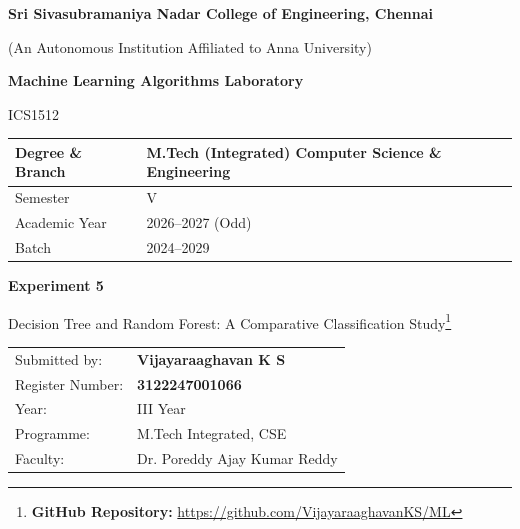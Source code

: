\documentclass[11pt,a4paper]{article}
\title{}
\date{}
\begin{document}
\begin{titlepage}
\centering
\vspace*{1cm}
{\Large\bfseries Sri Sivasubramaniya Nadar College of Engineering, Chennai\par}
\vspace{0.2cm}
{\normalsize (An Autonomous Institution Affiliated to Anna University)\par}
\vspace{1.2cm}

{\Large\bfseries Machine Learning Algorithms Laboratory\par}
\vspace{0.3cm}
{\large ICS1512\par}
\vspace{1.5cm}

\begin{tabular}{|p{5.5cm}|p{7cm}|}
\hline
Degree \& Branch & M.Tech (Integrated) Computer Science \& Engineering \\
\hline
Semester & V \\
\hline
Academic Year & 2026--2027 (Odd) \\
\hline
Batch & 2024--2029 \\
\hline
\end{tabular}

\vspace{1.8cm}
{\Large\bfseries Experiment 5\par}
\vspace{0.3cm}
{\large Decision Tree and Random Forest: A Comparative Classification Study\footnote{\textbf{GitHub Repository: }\url{https://github.com/VijayaraaghavanKS/ML}}\par}
\vspace{2.5cm}

\begin{tabular}{ll}
Submitted by: & \textbf{Vijayaraaghavan K S} \\[4pt]
Register Number: & \textbf{3122247001066} \\[4pt]
Year: & III Year \\[4pt]
Programme: & M.Tech Integrated, CSE \\[4pt]
Faculty: & Dr. Poreddy Ajay Kumar Reddy \\[4pt]
\end{tabular}

\vfill
\end{titlepage}

\tableofcontents
\newpage
\end{document}
